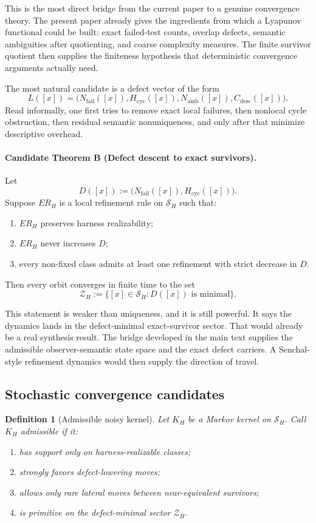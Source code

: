 \documentclass[11pt]{article}
\newtheorem{definition}[theorem]{Definition}
\theoremstyle{remark}
\theoremstyle{plain}
\begin{document}
This is the most direct bridge from the current paper to a genuine convergence theory. The present paper already gives the ingredients from which a Lyapunov functional could be built: exact failed-test counts, overlap defects, semantic ambiguities after quotienting, and coarse complexity measures. The finite survivor quotient then supplies the finiteness hypothesis that deterministic convergence arguments actually need.

The most natural candidate is a defect vector of the form
\[
L([x])=
\bigl(
N_{\mathrm{fail}}([x]),
H_{\mathrm{cyc}}([x]),
N_{\mathrm{amb}}([x]),
C_{\mathrm{desc}}([x])
\bigr).
\]
Read informally, one first tries to remove exact local failures, then nonlocal cycle obstruction, then residual semantic nonuniqueness, and only after that minimize descriptive overhead.

\paragraph{Candidate Theorem B (Defect descent to exact survivors).}
Let
\[
D([x]):=
\bigl(
N_{\mathrm{fail}}([x]),
H_{\mathrm{cyc}}([x])
\bigr).
\]
Suppose \(ER_H\) is a local refinement rule on \(\mathcal S_H\) such that:
\begin{enumerate}[leftmargin=2em]
\item \(ER_H\) preserves harness realizability;
\item \(ER_H\) never increases \(D\);
\item every non-fixed class admits at least one refinement with strict decrease in \(D\).
\end{enumerate}
Then every orbit converges in finite time to the set
\[
\mathcal Z_H:=
\{[x]\in \mathcal S_H: D([x])\text{ is minimal}\}.
\]

This statement is weaker than uniqueness, and it is still powerful. It says the dynamics lands in the defect-minimal exact-survivor sector. That would already be a real synthesis result. The bridge developed in the main text supplies the admissible observer-semantic state space and the exact defect carriers. A Senchal-style refinement dynamics would then supply the direction of travel.

\subsection{Stochastic convergence candidates}

\begin{definition}[Admissible noisy kernel]
Let \(K_H\) be a Markov kernel on \(\mathcal S_H\). Call \(K_H\) admissible if it:
\begin{enumerate}[leftmargin=2em]
\item has support only on harness-realizable classes;
\item strongly favors defect-lowering moves;
\item allows only rare lateral moves between near-equivalent survivors;
\item is primitive on the defect-minimal sector \(\mathcal Z_H\).
\end{enumerate}
\end{definition}
\end{document}
